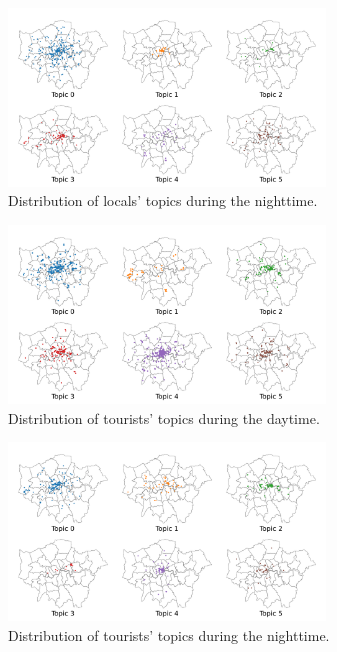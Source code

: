\documentclass{article}
\theoremstyle{definition}
\theoremstyle{remark}
\begin{document}
\begin{figure}[!h]
\centering
\includegraphics[width=0.75\textwidth]{figures/topics_distribution_nighttime_locals.png}
\caption{\label{fig:topics_distribution_nighttime_locals}Distribution of locals' topics during the nighttime.}
\end{figure}

\begin{figure}[!h]
\centering
\includegraphics[width=0.75\textwidth]{figures/topics_distribution_daytime_tourists.png}
\caption{\label{fig:topics_distribution_daytime_tourists}Distribution of tourists' topics during the daytime.}
\end{figure}

\begin{figure}[!h]
\centering
\includegraphics[width=0.75\textwidth]{figures/topics_distribution_nighttime_tourists.png}
\caption{\label{fig:topics_distribution_nighttime_tourists}Distribution of tourists' topics during the nighttime.}
\end{figure}
\end{document}
